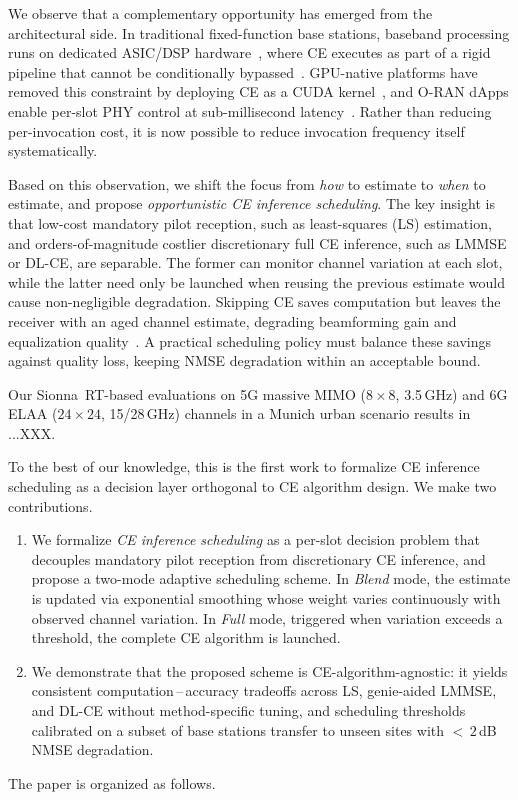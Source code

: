 We observe that a complementary opportunity has emerged from the architectural side.
In traditional fixed-function base stations, baseband processing runs on dedicated ASIC/DSP hardware~\cite{park2025vran}, where CE executes as part of a rigid pipeline that cannot be conditionally bypassed~\cite{venkataramani2020spectrum}.
GPU-native platforms have removed this constraint by deploying CE as a CUDA kernel~\cite{nvidia_aerial}, and O-RAN dApps enable per-slot PHY control at sub-millisecond latency~\cite{lacava2025dapps, polese2025airan}.
Rather than reducing per-invocation cost, it is now possible to reduce invocation frequency itself systematically.

Based on this observation, we shift the focus from \emph{how} to estimate to \emph{when} to estimate, and propose \emph{opportunistic CE inference scheduling}.
The key insight is that low-cost mandatory pilot reception, such as least-squares (LS) estimation, and orders-of-magnitude costlier discretionary full CE inference, such as LMMSE or DL-CE, are separable.
The former can monitor channel variation at each slot, while the latter need only be launched when reusing the previous estimate would cause non-negligible degradation.
Skipping CE saves computation but leaves the receiver with an aged channel estimate, degrading beamforming gain and equalization quality~\cite{truong2013effects}.
A practical scheduling policy must balance these savings against quality loss, keeping NMSE degradation within an acceptable bound.

Our Sionna~RT-based evaluations on 5G massive MIMO ($8\!\times\!8$, 3.5\,GHz) and 6G ELAA ($24\!\times\!24$, 15/28\,GHz) channels in a Munich urban scenario results in ...XXX.


To the best of our knowledge, this is the first work to formalize CE inference scheduling as a decision layer orthogonal to CE algorithm design.
We make two contributions.

\begin{enumerate}
\item We formalize \emph{CE inference scheduling} as a per-slot decision problem that decouples mandatory pilot reception from discretionary CE inference, and propose a two-mode adaptive scheduling scheme. In \emph{Blend} mode, the estimate is updated via exponential smoothing whose weight varies continuously with observed channel variation. In \emph{Full} mode, triggered when variation exceeds a threshold, the complete CE algorithm is launched.

\item We demonstrate that the proposed scheme is CE-algorithm-agnostic: it yields consistent computation\,--\,accuracy tradeoffs across LS, genie-aided LMMSE, and DL-CE without method-specific tuning, and scheduling thresholds calibrated on a subset of base stations transfer to unseen sites with ${<}\,2$\,dB NMSE degradation.
\end{enumerate}

The paper is organized as follows.